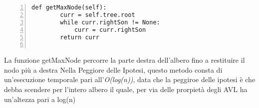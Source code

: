  \begin{minipage}{0.5\linewidth}
   	\begin{Verbatim}[frame=topline,numbers=left,label=Codice,framesep=5mm]
   def getMaxNode(self):
        curr = self.tree.root
        while curr.rightSon != None:
            curr = curr.rightSon
        return curr
        
    \end{Verbatim}
    \end{minipage}\hfill
\begin{minipage}{0.405\linewidth}
\ttfamily
La funzione getMaxNode percorre la parte destra dell'albero fino a restituire il nodo più a destra Nella Peggiore delle Ipotesi, questo metodo consta di un'esecuzione temporale pari all'\emph{O(log(n))}, data che la peggiroe delle  ipotesi è che debba scendere per l'intero albero il quale, per via delle prorpietà degli AVL  ha un'altezza pari a log(n)

\end{minipage}
\newline	
\newline
